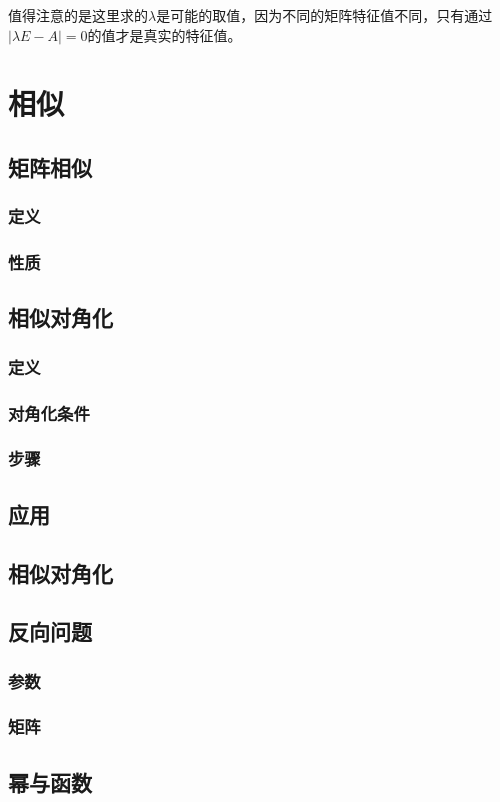 \documentclass[UTF8, 12pt]{ctexart}
\begin{document}
值得注意的是这里求的$\lambda$是可能的取值，因为不同的矩阵特征值不同，只有通过$\vert\lambda E-A\vert=0$的值才是真实的特征值。

\section{相似}

\subsection{矩阵相似}

\subsubsection{定义}

\subsubsection{性质}

\subsection{相似对角化}

\subsubsection{定义}

\subsubsection{对角化条件}

\subsubsection{步骤}

\subsection{应用}

\subsection{相似对角化}

\subsection{反向问题}

\subsubsection{参数}

\subsubsection{矩阵}

\subsection{幂与函数}
\end{document}
